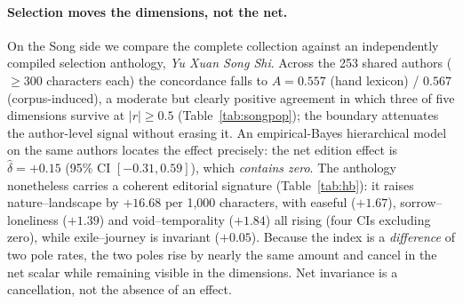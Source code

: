 \documentclass[10pt]{article}
\begin{document}
\paragraph{Selection moves the dimensions, not the net.} On the Song side we compare
the complete collection against an independently compiled selection anthology,
\emph{Yu Xuan Song Shi}. Across the 253 shared authors ($\ge300$ characters each) the
concordance falls to $A{=}0.557$ (hand lexicon) / $0.567$ (corpus-induced), a moderate
but clearly positive agreement in which three of five dimensions survive at
$|r|\ge0.5$ (Table~\ref{tab:songpop}); the boundary attenuates the author-level signal
without erasing it. An empirical-Bayes hierarchical model on the same authors locates
the effect precisely: the net edition effect is $\hat\delta{=}+0.15$ (95\% CI
$[-0.31,0.59]$), which \emph{contains zero}. The anthology nonetheless carries a
coherent editorial signature (Table~\ref{tab:hb}): it raises nature--landscape by
$+16.68$ per 1{,}000 characters, with easeful ($+1.67$), sorrow--loneliness ($+1.39$)
and void--temporality ($+1.84$) all rising (four CIs excluding zero), while
exile--journey is invariant ($+0.05$). Because the index is a \emph{difference} of two
pole rates, the two poles rise by nearly the same amount and cancel in the net scalar
while remaining visible in the dimensions. Net invariance is a cancellation, not the
absence of an effect.
\end{document}
